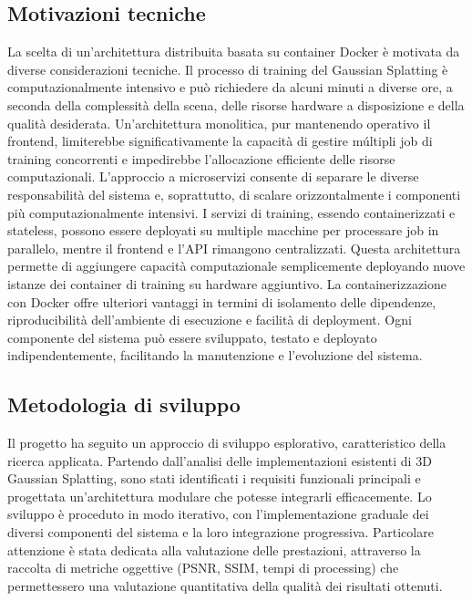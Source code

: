 \subsection*{Motivazioni tecniche}
La scelta di un'architettura distribuita basata su container Docker è motivata da diverse considerazioni tecniche. Il processo di training del Gaussian Splatting è computazionalmente intensivo e può richiedere da alcuni minuti a diverse ore, a seconda della complessità della scena, delle risorse hardware a disposizione e della qualità desiderata. Un'architettura monolitica, pur mantenendo operativo il frontend, limiterebbe significativamente la capacità di gestire múltipli job di training concorrenti e impedirebbe l'allocazione efficiente delle risorse computazionali.
\newline
\newline
L'approccio a microservizi consente di separare le diverse responsabilità del sistema e, soprattutto, di scalare orizzontalmente i componenti più computazionalmente intensivi. I servizi di training, essendo containerizzati e stateless, possono essere deployati su multiple macchine per processare job in parallelo, mentre il frontend e l'API rimangono centralizzati. 
Questa architettura permette di aggiungere capacità computazionale semplicemente deployando nuove istanze dei container di training su hardware aggiuntivo.
\newline
\newline
La containerizzazione con Docker offre ulteriori vantaggi in termini di isolamento delle dipendenze, riproducibilità dell'ambiente di esecuzione e facilità di deployment. Ogni componente del sistema può essere sviluppato, testato e deployato indipendentemente, facilitando la manutenzione e l'evoluzione del sistema.
\subsection*{Metodologia di sviluppo}
Il progetto ha seguito un approccio di sviluppo esplorativo, caratteristico della ricerca applicata. Partendo dall'analisi delle implementazioni esistenti di 3D Gaussian Splatting, sono stati identificati i requisiti funzionali principali e progettata un'architettura modulare che potesse integrarli efficacemente.
\newline
\newline
Lo sviluppo è proceduto in modo iterativo, con l'implementazione graduale dei diversi componenti del sistema e la loro integrazione progressiva. Particolare attenzione è stata dedicata alla valutazione delle prestazioni, attraverso la raccolta di metriche oggettive (PSNR, SSIM, tempi di processing) che permettessero una valutazione quantitativa della qualità dei risultati ottenuti.


